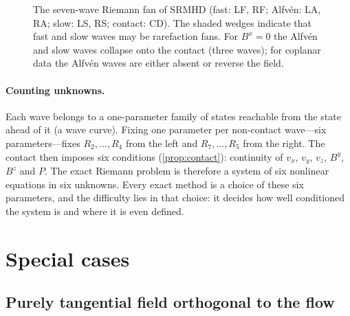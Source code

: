 \documentclass[11pt,a4paper,oneside,openany]{book}
\theoremstyle{definition}
\theoremstyle{plain}
\theoremstyle{remark}
\newcommand{\Ptot}{P}
\begin{document}
\begin{figure}[t]
\centering
{}
\caption{The seven-wave Riemann fan of SRMHD (fast: LF, RF; Alfvén: LA, RA; slow: LS, RS;
contact: CD). The shaded wedges indicate that fast and slow waves may be rarefaction fans.
For $B^x=0$ the Alfvén and slow waves collapse onto the contact (three waves); for
coplanar data the Alfvén waves are either absent or reverse the field.}
\label{fig:sevenwave}
\end{figure}

\paragraph{Counting unknowns.} Each wave belongs to a one-parameter family of states
reachable from the state ahead of it (a wave curve). Fixing one parameter per non-contact
wave---six parameters---fixes $R_2,\dots,R_4$ from the left and $R_7,\dots,R_5$ from the
right. The contact then imposes six conditions (\cref{prop:contact}): continuity of $v_x$,
$v_y$, $v_z$, $B^y$, $B^z$ and $\Ptot$. The exact Riemann problem is therefore a system of
six nonlinear equations in six unknowns. Every exact method is a choice of these six
parameters, and the difficulty lies in that choice: it decides how well conditioned the
system is and where it is even defined.

\section{Special cases}\label{sec:bx0}

\subsection{Purely tangential field orthogonal to the flow}\label{sec:romero}
\end{document}
